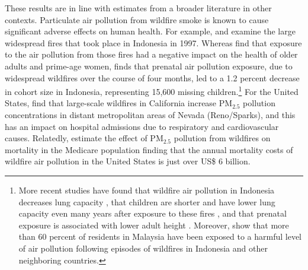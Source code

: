 \documentclass[11pt]{article}
\begin{document}
\begin{spacing}{1.5}
These results are in line with estimates from a broader literature in other contexts.  Particulate air pollution from wildfire smoke is known to cause significant adverse effects on human health. For example, \cite{frankenberg2005health} and \cite{jayachandran2009air} examine the large widespread fires that took place in Indonesia in 1997. Whereas \cite{frankenberg2005health} find that exposure to the air pollution from those fires had a negative  impact on the health of older adults and prime-age women, \cite{jayachandran2009air} finds that prenatal air pollution exposure, due to widespread wildfires over the course of four months, led to a 1.2 percent decrease in cohort size in Indonesia, representing 15,600 missing children.\footnote{More recent studies have found that wildfire air pollution in Indonesia decreases lung capacity \citep{Pakhtigian2020where}, that children are shorter and have lower lung capacity even many years after exposure to these fires \citep{rosales2019persistent}, and that prenatal exposure is associated with lower adult height \citep{tan2019seeking}. Moreover, \cite{mead2018impact} show that more than 60 percent of residents in Malaysia have been exposed to a harmful level of air pollution following episodes of wildfires in Indonesia and other neighboring countries.} For the United States, \cite{moeltner2013wildfire} find that large-scale wildfires in California increase PM$_{2.5}$ pollution concentrations in distant metropolitan areas of Nevada (Reno/Sparks), and this has an impact on hospital admissions due to respiratory and cardiovascular causes. Relatedly, \cite{miller2017blowing}  estimate the effect of PM$_{2.5}$ pollution from wildfires on mortality in the Medicare population finding that the annual mortality costs of wildfire air pollution  in the United States is just over US\$ 6 billion.%






\end{spacing}
\end{document}
